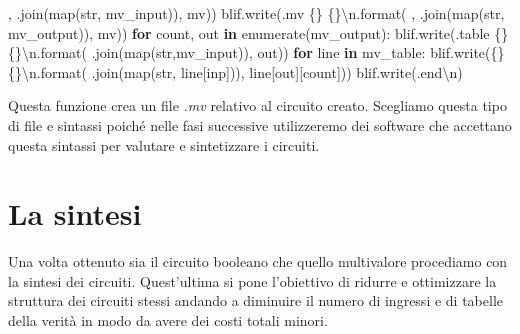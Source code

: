 \documentclass[
  italian,
]{book}
\newenvironment{Shaded}{\begin{snugshade}}{\end{snugshade}}
\newcommand{\BuiltInTok}[1]{#1}
\newcommand{\CharTok}[1]{\textcolor[rgb]{0.31,0.60,0.02}{#1}}
\newcommand{\ControlFlowTok}[1]{\textcolor[rgb]{0.13,0.29,0.53}{\textbf{#1}}}
\newcommand{\KeywordTok}[1]{\textcolor[rgb]{0.13,0.29,0.53}{\textbf{#1}}}
\newcommand{\NormalTok}[1]{#1}
\newcommand{\SpecialCharTok}[1]{\textcolor[rgb]{0.00,0.00,0.00}{#1}}
\newcommand{\StringTok}[1]{\textcolor[rgb]{0.31,0.60,0.02}{#1}}
\begin{document}
\begin{Shaded}
\begin{Highlighting}[]
        \StringTok{\textquotesingle{}, \textquotesingle{}}\NormalTok{.join(}\BuiltInTok{map}\NormalTok{(}\BuiltInTok{str}\NormalTok{, mv\_input)), mv))}
\NormalTok{    blif.write(}\StringTok{\textquotesingle{}.mv }\SpecialCharTok{\{\}}\StringTok{ }\SpecialCharTok{\{\}}\CharTok{\textbackslash{}n}\StringTok{\textquotesingle{}}\NormalTok{.}\BuiltInTok{format}\NormalTok{(}
        \StringTok{\textquotesingle{}, \textquotesingle{}}\NormalTok{.join(}\BuiltInTok{map}\NormalTok{(}\BuiltInTok{str}\NormalTok{, mv\_output)), mv))}
    \ControlFlowTok{for}\NormalTok{ count, out }\KeywordTok{in} \BuiltInTok{enumerate}\NormalTok{(mv\_output):}
\NormalTok{        blif.write(}\StringTok{\textquotesingle{}.table }\SpecialCharTok{\{\}}\StringTok{ }\SpecialCharTok{\{\}}\CharTok{\textbackslash{}n}\StringTok{\textquotesingle{}}\NormalTok{.}\BuiltInTok{format}\NormalTok{(}\StringTok{\textquotesingle{} \textquotesingle{}}\NormalTok{.join(}\BuiltInTok{map}\NormalTok{(}\BuiltInTok{str}\NormalTok{,mv\_input)), out))}
        \ControlFlowTok{for}\NormalTok{ line }\KeywordTok{in}\NormalTok{ mv\_table:}
\NormalTok{            blif.write(}\StringTok{\textquotesingle{}}\SpecialCharTok{\{\}}\StringTok{ }\SpecialCharTok{\{\}}\CharTok{\textbackslash{}n}\StringTok{\textquotesingle{}}\NormalTok{.}\BuiltInTok{format}\NormalTok{(}
                \StringTok{\textquotesingle{} \textquotesingle{}}\NormalTok{.join(}\BuiltInTok{map}\NormalTok{(}\BuiltInTok{str}\NormalTok{, line[}\StringTok{\textquotesingle{}inp\textquotesingle{}}\NormalTok{])), line[}\StringTok{\textquotesingle{}out\textquotesingle{}}\NormalTok{][count]))}
\NormalTok{    blif.write(}\StringTok{\textquotesingle{}.end}\CharTok{\textbackslash{}n}\StringTok{\textquotesingle{}}\NormalTok{)}
\end{Highlighting}
\end{Shaded}

Questa funzione crea un file \emph{.mv} relativo al circuito creato. Scegliamo questa tipo di file e sintassi poiché nelle fasi successive utilizzeremo dei software che accettano questa sintassi per valutare e sintetizzare i circuiti.

\newpage

\hypertarget{la-sintesi}{%
\section{La sintesi}\label{la-sintesi}}

Una volta ottenuto sia il circuito booleano che quello multivalore procediamo con la sintesi dei circuiti. Quest'ultima si pone l'obiettivo di ridurre e ottimizzare la struttura dei circuiti stessi andando a diminuire il numero di ingressi e di tabelle della verità in modo da avere dei costi totali minori.
\end{document}
